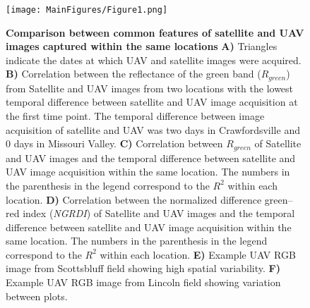 \documentclass[12pt,twoside]{gsag3jnl}
\begin{document}
\begin{figure}[h]
    \centering
    \texttt{[image: MainFigures/Figure1.png]}
    \caption{\textbf{Comparison between common features of satellite and UAV images captured within the same locations} \textbf{A)} Triangles indicate the dates at which UAV and satellite images were acquired. \textbf{B)} Correlation between the reflectance of the green band (\textit{$R_{green}$}) from Satellite and UAV images from two locations with the lowest temporal difference between satellite and UAV image acquisition at the first time point. The temporal difference between image acquisition of satellite and UAV was two days in Crawfordsville and 0 days in Missouri Valley. \textbf{C)} Correlation between \textit{$R_{green}$} of Satellite and UAV images and the temporal difference between satellite and UAV image acquisition within the same location. The numbers in the parenthesis in the legend correspond to the $R^2$ within each location. \textbf{D)} Correlation between the normalized difference green–red index (\textit{NGRDI}) of Satellite and UAV images and the temporal difference between satellite and UAV image acquisition within the same location. The numbers in the parenthesis in the legend correspond to the $R^2$ within each location. \textbf{E)} Example UAV RGB image from Scottsbluff field showing high spatial variability. \textbf{F)} Example UAV RGB image from Lincoln field showing variation between plots. 
    }
    \label{fig:Figure1}
\end{figure}
\end{document}
